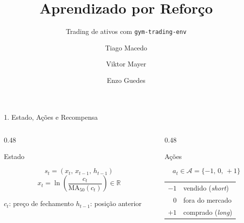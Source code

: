 \documentclass[aspectratio=169,10pt,t]{beamer}
\title[Aprendizado por Reforço em Trading]{Aprendizado por Reforço}
\subtitle{Trading de ativos com \texttt{gym-trading-env}}
\author[Macedo, Mayer, Guedes]{Tiago Macedo \and Viktor Mayer \and Enzo Guedes}
\institute{IBMEC \\[0.25cm] Professor: Rodrigo Luna}
\date{}
\newenvironment{altura}[2][c]{\begin{minipage}[t][#2][#1]{\linewidth}}{\end{minipage}}
\begin{document}
\begin{frame}[plain,c]
  \titlepage
\end{frame}


\begin{frame}{1. Estado, Ações e Recompensa}

  \begin{columns}[T,onlytextwidth]
    \begin{column}{0.48\textwidth}
      \begin{block}{Estado}
        \begin{altura}{2.4cm}
        \[
          s_t = (x_t,\, x_{t-1},\, h_{t-1})
        \]
        \[
          x_t = \ln\left(\frac{c_t}{\text{MA}_{50}(c_t)}\right) \in \mathbb{R}
        \]
        {\centering\footnotesize $c_t$: preço de fechamento \qquad $h_{t-1}$: posição anterior\par}
        \end{altura}
      \end{block}
    \end{column}

    \begin{column}{0.48\textwidth}
      \begin{block}{Ações}
        \begin{altura}{2.4cm}
        \[
          a_t \in \mathcal{A} = \{-1,\, 0,\, +1\}
        \]
        {\centering\small
        \renewcommand{\arraystretch}{1.15}
        \begin{tabular}{r l}
          $-1$ & vendido (\textit{short}) \\
          $0$  & fora do mercado \\
          $+1$ & comprado (\textit{long}) \\
        \end{tabular}\par}
        \end{altura}
      \end{block}
    \end{column}
  \end{columns}


\end{frame}
\end{document}
